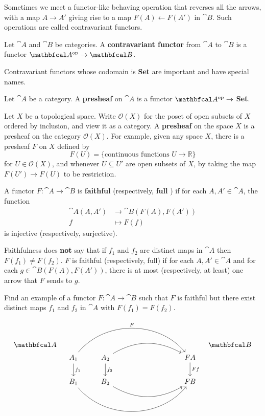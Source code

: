 Sometimes we meet a functor-like behaving operation that reverses all the arrows, with a map $A\to A'$ giving rise to a map $F(A)\leftarrow F(A')$ in $\cat{B}$. Such operations are called contravariant functors.

\begin{definition}
    Let $\cat{A}$ and $\cat{B}$ be categories. A \textbf{contravariant functor}  from $\cat{A}$ to $\cat{B}$ is a functor $\catop{A}\to \cat{B}$.
\end{definition}
Contravariant functors whose codomain is \textbf{Set} are important and have special names.
\begin{definition}
    Let $\cat{A}$ be a category. A \textbf{presheaf} on $\cat{A}$ is a functor $\catop{A}\to$ \textbf{Set}.
\end{definition}
Let $X$ be a topological space. Write $\mathcal{O}(X)$ for the poset of open subsets of $X$ ordered by inclusion, and view it as a category. A \textbf{presheaf} on the space $X$ is a presheaf on the category $\mathcal{O}(X)$. For example, given any space $X$, there is a presheaf $F$ on $X$ defined by
$$F(U)=\{\text{continuous functions } U\to \mathbb{R}\}$$
for $U\in \mathcal{O}(X)$, and whenever $U\subseteq U'$ are open subsets of $X$, by taking the map $F(U')\to F(U)$ to be restriction.

\begin{definition}
    A functor $F: \cat{A}\to \cat{B}$ is \textbf{faithful} (respectively, \textbf{full} ) if for each $A,A'\in \cat{A}$, the function
    $$\begin{aligned}
        \cat{A}( A,A' ) &\to \cat{B}(F(A),F(A'))\\
        f &\mapsto F(f)
    \end{aligned}$$
    is injective (respectively, surjective).
\end{definition}

\begin{remark}
    Faithfulness does \textbf{not} say that if $f_1$ and $f_2$ are distinct maps in $\cat{A}$ then $F(f_1) \neq F(f_2)$. $F$ is faithful (respectively, full) if for each $A,A'\in \cat{A}$ and for each $g\in \cat{B}(F(A),F(A'))$, there is at most (respectively, at least) one arrow that $F$ sends to $g$.
\end{remark}

\begin{exercise}
    Find an example of a functor $F:\cat{A}\to \cat{B}$ such that $F$ is faithful but there exist distinct maps $f_1$ and $f_2$ in $\cat{A}$ with $F(f_1)=F(f_2)$.
\end{exercise}
\begin{solution}
\begin{equation*}
\begin{tikzcd}
    \cat{A}  &[-15pt]&&&&&&[-15pt] \cat{B} \\[-15pt]
    &[-15pt] A_1 \arrow[d, "f_1"] \arrow[rrrrr, bend left=50, "F"] & A_2 \arrow[d,"f_2"] \arrow[rrrr, bend left=30] &&&& FA \arrow[d, "Ff"] \\
    & B_1 \arrow[rrrrr, bend right=50] & B_2 \arrow[rrrr, bend right=30] &&&& FB
\end{tikzcd}
\end{equation*}
\end{solution}

